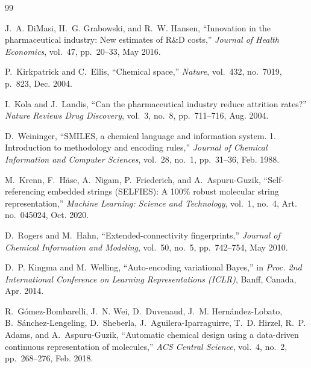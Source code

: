 \documentclass[12pt,a4paper]{report}
\begin{document}

\clearpage
{}
\begin{thebibliography}{99}


J.~A. DiMasi, H.~G. Grabowski, and R.~W. Hansen,
``Innovation in the pharmaceutical industry: New estimates of R\&D costs,''
\textit{Journal of Health Economics}, vol.~47, pp.~20--33, May 2016.

P.~Kirkpatrick and C.~Ellis,
``Chemical space,''
\textit{Nature}, vol.~432, no.~7019, p.~823, Dec. 2004.

I.~Kola and J.~Landis,
``Can the pharmaceutical industry reduce attrition rates?''
\textit{Nature Reviews Drug Discovery}, vol.~3, no.~8, pp.~711--716, Aug. 2004.


D.~Weininger,
``SMILES, a chemical language and information system. 1. Introduction to methodology and encoding rules,''
\textit{Journal of Chemical Information and Computer Sciences}, vol.~28, no.~1, pp.~31--36, Feb. 1988.

M.~Krenn, F.~H\"{a}se, A.~Nigam, P.~Friederich, and A.~Aspuru-Guzik,
``Self-referencing embedded strings (SELFIES): A 100\% robust molecular string representation,''
\textit{Machine Learning: Science and Technology}, vol.~1, no.~4, Art. no.~045024, Oct. 2020.

D.~Rogers and M.~Hahn,
``Extended-connectivity fingerprints,''
\textit{Journal of Chemical Information and Modeling}, vol.~50, no.~5, pp.~742--754, May 2010.


D.~P. Kingma and M.~Welling,
``Auto-encoding variational Bayes,''
in \textit{Proc. 2nd International Conference on Learning Representations (ICLR)},
Banff, Canada, Apr. 2014.

R.~G\'{o}mez-Bombarelli, J.~N. Wei, D.~Duvenaud, J.~M. Hern\'{a}ndez-Lobato, B.~S\'{a}nchez-Lengeling, D.~Sheberla, J.~Aguilera-Iparraguirre, T.~D. Hirzel, R.~P. Adams, and A.~Aspuru-Guzik,
``Automatic chemical design using a data-driven continuous representation of molecules,''
\textit{ACS Central Science}, vol.~4, no.~2, pp.~268--276, Feb. 2018.


\end{thebibliography}
\end{document}
